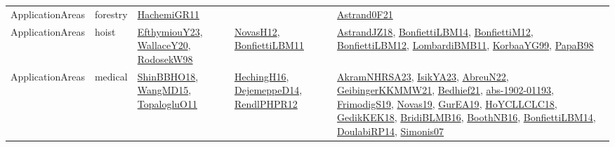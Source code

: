 {\begin{longtable}{lp{3cm}>{\raggedright}p{6cm}>{\raggedright}p{6cm}p{8cm}}
ApplicationAreas & forestry & \href{articles/HachemiGR11.pdf}{HachemiGR11}\cite{HachemiGR11} &  & \href{papers/Astrand0F21.pdf}{Astrand0F21}\cite{Astrand0F21}\\
ApplicationAreas & hoist & \href{papers/EfthymiouY23.pdf}{EfthymiouY23}\cite{EfthymiouY23}, \href{articles/WallaceY20.pdf}{WallaceY20}\cite{WallaceY20}, \href{papers/RodosekW98.pdf}{RodosekW98}\cite{RodosekW98} & \href{articles/NovasH12.pdf}{NovasH12}\cite{NovasH12}, \href{papers/BonfiettiLBM11.pdf}{BonfiettiLBM11}\cite{BonfiettiLBM11} & \href{papers/AstrandJZ18.pdf}{AstrandJZ18}\cite{AstrandJZ18}, \href{articles/BonfiettiLBM14.pdf}{BonfiettiLBM14}\cite{BonfiettiLBM14}, \href{papers/BonfiettiM12.pdf}{BonfiettiM12}\cite{BonfiettiM12}, \href{papers/BonfiettiLBM12.pdf}{BonfiettiLBM12}\cite{BonfiettiLBM12}, \href{papers/LombardiBMB11.pdf}{LombardiBMB11}\cite{LombardiBMB11}, \href{papers/KorbaaYG99.pdf}{KorbaaYG99}\cite{KorbaaYG99}, \href{articles/PapaB98.pdf}{PapaB98}\cite{PapaB98}\\
ApplicationAreas & medical & \href{articles/ShinBBHO18.pdf}{ShinBBHO18}\cite{ShinBBHO18}, \href{articles/WangMD15.pdf}{WangMD15}\cite{WangMD15}, \href{articles/TopalogluO11.pdf}{TopalogluO11}\cite{TopalogluO11} & \href{papers/HechingH16.pdf}{HechingH16}\cite{HechingH16}, \href{papers/DejemeppeD14.pdf}{DejemeppeD14}\cite{DejemeppeD14}, \href{papers/RendlPHPR12.pdf}{RendlPHPR12}\cite{RendlPHPR12} & \href{articles/AkramNHRSA23.pdf}{AkramNHRSA23}\cite{AkramNHRSA23}, \href{articles/IsikYA23.pdf}{IsikYA23}\cite{IsikYA23}, \href{articles/AbreuN22.pdf}{AbreuN22}\cite{AbreuN22}, \href{papers/GeibingerKKMMW21.pdf}{GeibingerKKMMW21}\cite{GeibingerKKMMW21}, \href{articles/Bedhief21.pdf}{Bedhief21}\cite{Bedhief21}, \href{articles/abs-1902-01193.pdf}{abs-1902-01193}\cite{abs-1902-01193}, \href{papers/FrimodigS19.pdf}{FrimodigS19}\cite{FrimodigS19}, \href{articles/Novas19.pdf}{Novas19}\cite{Novas19}, \href{articles/GurEA19.pdf}{GurEA19}\cite{GurEA19}, \href{papers/HoYCLLCLC18.pdf}{HoYCLLCLC18}\cite{HoYCLLCLC18}, \href{articles/GedikKEK18.pdf}{GedikKEK18}\cite{GedikKEK18}, \href{articles/BridiBLMB16.pdf}{BridiBLMB16}\cite{BridiBLMB16}, \href{papers/BoothNB16.pdf}{BoothNB16}\cite{BoothNB16}, \href{articles/BonfiettiLBM14.pdf}{BonfiettiLBM14}\cite{BonfiettiLBM14}, \href{papers/DoulabiRP14.pdf}{DoulabiRP14}\cite{DoulabiRP14}, \href{articles/Simonis07.pdf}{Simonis07}\cite{Simonis07}\\

\end{longtable}}
